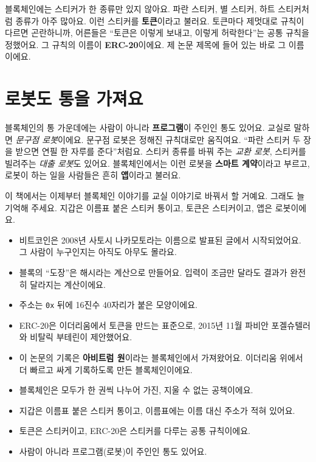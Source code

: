 블록체인에는 스티커가 한 종류만 있지 않아요.
파란 스티커, 별 스티커, 하트 스티커처럼 종류가 아주 많아요.
이런 스티커를 \textbf{토큰}이라고 불러요.
토큰마다 제멋대로 규칙이 다르면 곤란하니까, 어른들은 “토큰은 이렇게 보내고, 이렇게 허락한다”는 공통 규칙을 정했어요.
그 규칙의 이름이 \textbf{ERC-20}이에요.
제 논문 제목에 들어 있는 바로 그 이름이에요.

\section{로봇도 통을 가져요}

블록체인의 통 가운데에는 사람이 아니라 \textbf{프로그램}이 주인인 통도 있어요.
교실로 말하면 \emph{문구점 로봇}이에요.
문구점 로봇은 정해진 규칙대로만 움직여요.
“파란 스티커 두 장을 받으면 연필 한 자루를 준다”처럼요.
스티커 종류를 바꿔 주는 \emph{교환 로봇}, 스티커를 빌려주는 \emph{대출 로봇}도 있어요.
블록체인에서는 이런 로봇을 \textbf{스마트 계약}이라고 부르고, 로봇이 하는 일을 사람들은 흔히 \textbf{앱}이라고 불러요.

이 책에서는 이제부터 블록체인 이야기를 교실 이야기로 바꿔서 할 거예요.
그래도 늘 기억해 주세요.
지갑은 이름표 붙은 스티커 통이고, 토큰은 스티커이고, 앱은 로봇이에요.

\begin{deeper}[진짜 용어]
\begin{itemize}
\item 비트코인은 2008년 사토시 나카모토라는 이름으로 발표된 글에서 시작되었어요. 그 사람이 누구인지는 아직도 아무도 몰라요.
\item 블록의 “도장”은 해시라는 계산으로 만들어요. 입력이 조금만 달라도 결과가 완전히 달라지는 계산이에요.
\item 주소는 \texttt{0x} 뒤에 16진수 40자리가 붙은 모양이에요.
\item ERC-20은 이더리움에서 토큰을 만드는 표준으로, 2015년 11월 파비안 포겔슈텔러와 비탈릭 부테린이 제안했어요.
\item 이 논문의 기록은 \textbf{아비트럼 원}이라는 블록체인에서 가져왔어요. 이더리움 위에서 더 빠르고 싸게 기록하도록 만든 블록체인이에요.
\end{itemize}
\end{deeper}

\begin{learned}
\begin{itemize}
\item 블록체인은 모두가 한 권씩 나누어 가진, 지울 수 없는 공책이에요.
\item 지갑은 이름표 붙은 스티커 통이고, 이름표에는 이름 대신 주소가 적혀 있어요.
\item 토큰은 스티커이고, ERC-20은 스티커를 다루는 공통 규칙이에요.
\item 사람이 아니라 프로그램(로봇)이 주인인 통도 있어요.
\end{itemize}
\end{learned}
